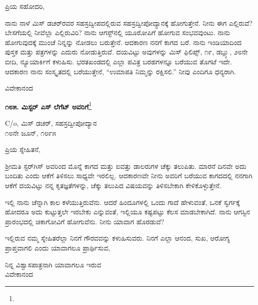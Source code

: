 \vspace{-0.5cm}

\noindent
ಪ್ರಿಯ ಸಹೋದರಿ,

ನಾನು ನಾಳೆ ಮಿಸ್‌ ಡಚರ್‌ರವರ ಸಹಸ್ರದ್ವೀಪದಲ್ಲಿರುವ ಸಹಸ್ರದ್ವೀಪೋದ್ಯಾನಕ್ಕೆ ಹೋಗುತ್ತೇನೆ. ನೀನು ಈಗ ಎಲ್ಲಿರುವೆ? ಬೇಸಗೆಯಲ್ಲಿ ನೀವೆಲ್ಲಾ ಎಲ್ಲಿರುವಿರಿ? ನಾನು ಆಗಸ್ಟ್‌ನಲ್ಲಿ ಯೂರೋಪಿಗೆ ಹೋಗುವ ಸಂಭವವುಂಟು. ನಾನು ಹೋಗುವುದಕ್ಕೆ ಮುಂಚೆ ನಿನ್ನನ್ನು ನೋಡಲು ಬರುತ್ತೇನೆ. ಆದಕಾರಣ ನನಗೆ ಕಾಗದ ಬರೆ. ನಾನು ಇಂಡಿಯಾದಿಂದ ಪುಸ್ತಕ ಮತ್ತು ಪತ್ರಗಳನ್ನು ಎದುರು ನೋಡುತ್ತಿರುವೆ. ದಯವಿಟ್ಟು ಅವುಗಳನ್ನು  ಮಿಸ್ ಫಿಲಿಪ್ಸ್, ೧೯, ಡಬ್ಲ್ಯು, ೨೮ನೇ ಬೀದಿ, ನ್ಯೂಯಾರ್ಕಿಗೆ ಕಳುಹಿಸು. ಭರತಖಂಡದಲ್ಲಿ ಎಲ್ಲಾ ಪವಿತ್ರ ಬರಹಗಳನ್ನೂ ಬರೆಯುವ ತೊಗಟೆ ಇದೇ. ಆದಕಾರಣ ನಾನು ಸಂಸ್ಕೃತದಲ್ಲಿ ಬರೆಯುತ್ತೇನೆ, “ಉಮಾಪತಿ ನಿಮ್ಮನ್ನು ರಕ್ಷಿಸಲಿ.'' ನೀವು ಎಂದಿಗೂ ಧನ್ಯರಾಗಿ.

\vspace{-0.5cm}

{\flushright
ವಿವೇಕಾನಂದ\par}

\begin{center}
\textbf{೧೮೫. ಮಿಸ್ಟರ್ ಎಸ್ ಲೆಗೆಟ್ ಅವರಿಗೆ}\footnote{}
\end{center}

\vspace{-0.5cm}

\begin{flushright}
C/o, ಮಿಸ್‌ ಡಚರ್‌, ಸಹಸ್ರದ್ವೀಪೋದ್ಯಾನ\\೧೮ನೇ ಜೂನ್, ೧೮೯೫
\end{flushright}

\vspace{-0.5cm}

\noindent
ಪ್ರಿಯ ಸ್ನೇಹಿತನೆ,

ಶ‍್ರೀಮತಿ ಸ್ಟರ್‌ಗಿಸ್ ಅವರಿಂದ ಮೊನ್ನೆ ಕಾಗದ ಮತ್ತು ಐವತ್ತು ಡಾಲರುಗಳ ಚೆಕ್ಕು ತಲುಪಿತು. ಮಾರನೆ ದಿನವೇ ಅದು ಬಂದಿತು ಎಂದು ಆಕೆಗೆ ತಿಳಿಸಲು ಸಾಧ್ಯವೇ ಇರಲಿಲ್ಲ. ಆದಕಾರಣವೇ ನೀನು ಅವರಿಗೆ ಬರೆಯುವ ಕಾಗದದಲ್ಲಿ ನನಗಾಗಿ ಆಕೆಗೆ ದಯವಿಟ್ಟು ನನ್ನ ಕೃತಜ್ಞತೆಗಳನ್ನು, ಚೆಕ್ಕು ತಲುಪಿದ ವಿಷಯವನ್ನು ತಿಳಿಸಬೇಕಾಗಿ ಕೇಳಿಕೊಳ್ಳುತ್ತೇನೆ.

ಇಲ್ಲಿ ನಾನು ಚೆನ್ನಾಗಿ ಕಾಲ ಕಳೆಯುತ್ತಿರುವೆನು. ಆದರೆ ಹಿಂದೂಗಳಲ್ಲಿ ಒಂದು ಗಾದೆ ಹೇಳುವಂತೆ, ಒನಕೆ ಸ್ವರ್ಗಕ್ಕೆ ಹೋದರೂ ಅದು ಕುಟ್ಟುತ್ತಲೇ ಇರಬೇಕು ಎನ್ನುವಂತೆ, ಇಲ್ಲಿಯೂ ಕಷ್ಟಪಟ್ಟು ಕೆಲಸ ಮಾಡಬೇಕಾಗಿದೆ. ನಾನು ಆಗಸ್ಟಿನ ಪ್ರಾರಂಭದಲ್ಲಿ ಚಿಕಾಗೋವಿಗೆ ಹೋಗುವೆನು. ನೀನು ಯಾವಾಗ ಹೊರಡುವೆ?

ಇಲ್ಲಿರುವ ನಮ್ಮ ಸ್ನೇಹಿತರೆಲ್ಲಾ ನಿನಗೆ ಗೌರವವನ್ನು ಕಳುಹಿಸುವರು. ನಿನಗೆ ಎಲ್ಲಾ ಆನಂದ, ಸುಖ, ಆರೋಗ್ಯ ಪ್ರಾಪ್ತವಾಗಲಿ ಎಂದು ಯಾವಾಗಲೂ ಪ್ರಾರ್ಥಿಸುವ,

\vspace{-0.3cm}

{\flushright
ನಿನ್ನ ವಿಶ್ವಾಸಪಾತ್ರನಾಗಿ ಯಾವಾಗಲೂ ಇರುವ\\ವಿವೇಕಾನಂದ\par}

